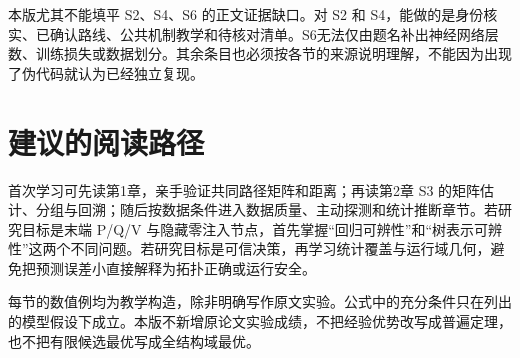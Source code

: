 本版尤其不能填平 S2、S4、S6 的正文证据缺口。对 S2 和 S4，能做的是身份核实、已确认路线、公共机制教学和待核对清单。S6无法仅由题名补出神经网络层数、训练损失或数据划分。其余条目也必须按各节的来源说明理解，不能因为出现了伪代码就认为已经独立复现。

\section*{建议的阅读路径}
首次学习可先读第1章，亲手验证共同路径矩阵和距离；再读第2章 S3 的矩阵估计、分组与回溯；随后按数据条件进入数据质量、主动探测和统计推断章节。若研究目标是末端 P/Q/V 与隐藏零注入节点，首先掌握“回归可辨性”和“树表示可辨性”这两个不同问题。若研究目标是可信决策，再学习统计覆盖与运行域几何，避免把预测误差小直接解释为拓扑正确或运行安全。

每节的数值例均为教学构造，除非明确写作原文实验。公式中的充分条件只在列出的模型假设下成立。本版不新增原论文实验成绩，不把经验优势改写成普遍定理，也不把有限候选最优写成全结构域最优。
